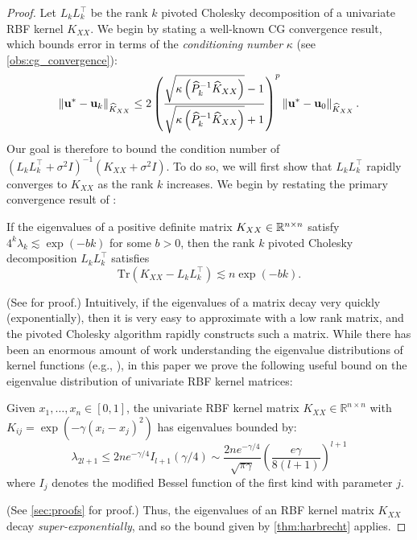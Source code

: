 \begin{proof}
Let $L_k L_k^\top$ be the rank $k$ pivoted Cholesky decomposition of a univariate RBF kernel $K_{XX}$.
  We begin by stating a well-known CG convergence result, which bounds error in terms of the \emph{conditioning number} $\kappa$ (see \autoref{obs:cg_convergence}):
\begin{equation}
  \label{eq:condition_number_convergence}
  \left\Vert \mathbf{u}^* - \mathbf{u}_{k} \right\Vert_{\widehat{K}_{XX}}
  \leq 2 \left( \frac {\sqrt{\kappa\left(\widehat{P}_{k}^{-1}\widehat{K}_{XX}\right)} - 1}{\sqrt{\kappa\left(\widehat{P}_{k}^{-1}\widehat{K}_{XX}\right)} + 1} \right)^{p} \left\Vert \mathbf{u}^* - \mathbf{u}_{0} \right\Vert_{\widehat{K}_{XX}}.
\end{equation}
Our goal is therefore to bound the condition number of $(L_k L_k^\top + \sigma^2 I)^{-1} (K_{XX} + \sigma^2 I)$.
To do so, we will first show that $L_k L_k^\top$ rapidly converges to $K_{XX}$ as the rank $k$ increases.
We begin by restating the primary convergence result of \cite{harbrecht2012low}:
%
\begin{lemma}
\label{thm:harbrecht}
  If the eigenvalues of a positive definite matrix $K_{XX} \in \mathbb{R}^{n \times n}$ satisfy $4^{k}\lambda_{k} \lesssim \exp(-bk)$ for some $b>0$, then
  the rank $k$ pivoted Cholesky decomposition $L_{k} L_k^\top$ satisfies
  $$
    \textrm{Tr}(K_{XX} -  L_k L_k^\top) \lesssim n\exp(-bk).
  $$
\end{lemma}
%
(See \citet{harbrecht2012low} for proof.)
Intuitively, if the eigenvalues of a matrix decay very quickly (exponentially), then it is very easy to approximate with a low rank matrix, and the pivoted Cholesky algorithm rapidly constructs such a matrix.
While there has been an enormous amount of work understanding the eigenvalue distributions of kernel functions (e.g., \cite{wathen2015spectral}), in this paper we prove the following useful bound on the eigenvalue distribution of univariate RBF kernel matrices:
%
\begin{lemma}
\label{thm:eigenvalue_bound}
Given $x_1, \ldots, x_n \in [0, 1]$, the univariate RBF kernel matrix $K_{XX} \in \mathbb{R}^{n \times n}$ with $K_{ij} = \exp \left(-\gamma(x_i - x_j)^{2}\right)$ has eigenvalues bounded by:
\begin{equation*}
  \lambda_{2l+1} \leq
  2n e^{-\gamma/4} I_{l+1}(\gamma/4) \sim
  \frac{2n e^{-\gamma/4}}{\sqrt{\pi\gamma}}
  \left( \frac{e\gamma}{8(l+1)} \right)^{l+1}
\end{equation*}
where $I_j$ denotes the modified Bessel function of the first kind with parameter $j$.
\end{lemma}
%
(See \autoref{sec:proofs} for proof.)
Thus, the eigenvalues of an RBF kernel matrix $K_{XX}$ decay \emph{super-exponentially}, and so the bound given by \autoref{thm:harbrecht} applies.


\end{proof}
